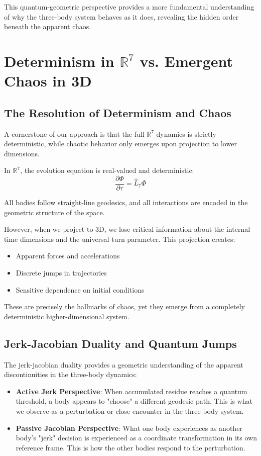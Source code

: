 \documentclass{article}
\begin{document}
This quantum-geometric perspective provides a more fundamental understanding of why the three-body system behaves as it does, revealing the hidden order beneath the apparent chaos.

\section{Determinism in $\mathbb{R}^7$ vs. Emergent Chaos in 3D}

\subsection{The Resolution of Determinism and Chaos}

A cornerstone of our approach is that the full $\mathbb{R}^7$ dynamics is strictly deterministic, while chaotic behavior only emerges upon projection to lower dimensions.

In $\mathbb{R}^7$, the evolution equation is real-valued and deterministic:
\begin{equation}
\frac{\partial \Phi}{\partial \tau} = \hat{L}_7 \Phi
\end{equation}

All bodies follow straight-line geodesics, and all interactions are encoded in the geometric structure of the space.

However, when we project to 3D, we lose critical information about the internal time dimensions and the universal turn parameter. This projection creates:
\begin{itemize}
\item Apparent forces and accelerations
\item Discrete jumps in trajectories
\item Sensitive dependence on initial conditions
\end{itemize}

These are precisely the hallmarks of chaos, yet they emerge from a completely deterministic higher-dimensional system.

\subsection{Jerk-Jacobian Duality and Quantum Jumps}

The jerk-jacobian duality provides a geometric understanding of the apparent discontinuities in the three-body dynamics:

\begin{itemize}
\item \textbf{Active Jerk Perspective}: When accumulated residue reaches a quantum threshold, a body appears to "choose" a different geodesic path. This is what we observe as a perturbation or close encounter in the three-body system.

\item \textbf{Passive Jacobian Perspective}: What one body experiences as another body's "jerk" decision is experienced as a coordinate transformation in its own reference frame. This is how the other bodies respond to the perturbation.
\end{itemize}
\end{document}
